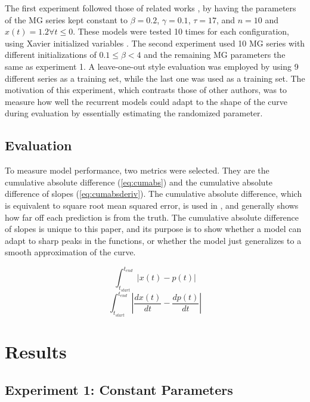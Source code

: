 \documentclass[11pt]{article}
\begin{document}
The first experiment followed those of related works \cite{tr, Farsa},
by having the
parameters of the MG series kept constant to $\beta = 0.2$,
$\gamma = 0.1$, $\tau = 17$, and $n = 10$ and $x(t)=1.2  \forall  t \leq 0$. These models were tested 10 times for each configuration, using Xavier initialized variables \cite{Xavier}. The second experiment used 10 MG series with different
initializations of $0.1 \leq \beta < 4$ and the remaining MG parameters the same as experiment 1. A leave-one-out style evaluation was employed by using 9 different series as a training
set, while the last one was used as a training set. The motivation of
this experiment, which contrasts those of other authors, was to measure
how well the recurrent models could adapt to the shape of the curve during
evaluation by essentially estimating the randomized parameter.

\subsection{Evaluation}
To measure model performance, two metrics were selected. They are
the cumulative absolute difference (\ref{eq:cumabs}) and the
cumulative absolute difference of slopes
(\ref{eq:cumabsderiv}). The cumulative absolute difference, which is
equivalent to square root mean squared error, is used 
in \cite{Farsa}, and generally shows how far off each prediction
is from the truth. The cumulative absolute difference of slopes is
unique to this paper, and its purpose is to show whether a model can
adapt to sharp peaks in the functions, or whether the model just
generalizes to a smooth approximation of the curve.

\begin{equation}
  \int_{t_{start}}^{t_{end}} | x(t) - p(t) |
\label{eq:cumabs}
\end{equation}
\begin{equation}
  \int_{t_{start}}^{t_{end}} | \frac{dx(t)}{dt} - \frac{dp(t)}{dt} |
\label{eq:cumabsderiv}
\end{equation}

\section {Results}
\subsection {Experiment 1: Constant Parameters}
\end{document}
